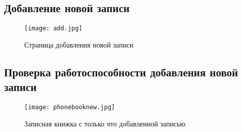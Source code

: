 \documentclass{article}
\begin{document}
\subsection{Добавление новой записи}
\begin{figure}[H]
	\begin{flushleft}
		\centerline{\texttt{[image: add.jpg]}}
		\caption{Страница добавления новой записи}
	\end{flushleft}
\end{figure}

\subsection{Проверка работоспособности добавления новой записи}
\begin{figure}[H]
	\begin{flushleft}
		\centerline{\texttt{[image: phonebooknew.jpg]}}
		\caption{Записная книжка с только что добавленной записью}
	\end{flushleft}
\end{figure}
\end{document}
